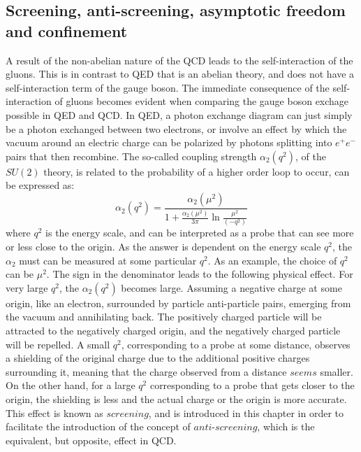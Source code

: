 \subsection*{Screening, anti-screening, asymptotic freedom and confinement}\label{sec:alpha} 
\noindent\justify
A result of the non-abelian nature of the QCD leads to the self-interaction of the gluons.
This is in contrast to QED that is an abelian theory, and does not have a self-interaction term of the gauge boson. 
The immediate consequence of the self-interaction of gluons becomes evident when comparing the gauge boson exchage possible in QED and QCD. 
In QED, a photon exchange diagram can just simply be a photon exchanged between two electrons, or involve an effect by which the vacuum around an electric charge can be polarized by photons splitting into $e^{+}e^{-}$ pairs that then recombine. 
The so-called coupling strength $\alpha_{2}(q^{2})$, of the $SU(2)$ theory, is related to the probability of a higher order loop to occur, can be expressed as:  
\begin{equation}
\alpha_{2}(q^{2})=\frac{\alpha_{2}(\mu^{2})}{1+\frac{\alpha_{2}(\mu^{2})}{3\pi}\ln\frac{\mu^{2}}{(-q^{2})}}
\label{eq:QEDalpha}
\end{equation}
where $q^{2}$ is the energy scale, and can be interpreted as a probe that can see more or less close to the origin. 
As the answer is dependent on the energy scale $q^{2}$, the $\alpha_{2}$ must can be measured at some particular $q^{2}$. As an example, the choice of $q^{2}$ can be $\mu^{2}$.
The sign in the denominator leads to the following physical effect. 
For very large $q^{2}$, the $\alpha_{2}(q^{2})$ becomes large. 
Assuming a negative charge at some origin, like an electron, surrounded by particle anti-particle pairs, emerging from the vacuum and annihilating back. 
The positively charged particle will be attracted to the negatively charged origin, and the negatively charged particle will be repelled.   
A small $q^{2}$, corresponding to a probe at some distance, observes a shielding of the original charge due to the additional positive charges surrounding it, meaning that the charge observed from a distance $seems$ smaller. 
On the other hand, for a large $q^{2}$ corresponding to a probe that gets closer to the origin, the shielding is less and the actual charge or the origin is more accurate. 
This effect is known as $screening$, and is introduced in this chapter in order to facilitate the introduction of the concept of $anti$-$screening$, which is the equivalent, but opposite, effect in QCD.
\newpara
